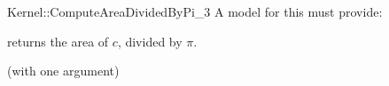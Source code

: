 \begin{ccRefFunctionObjectConcept}{Kernel::ComputeAreaDividedByPi_3}
A model for this must provide:


       {returns the area of $c$, divided by $\pi$. }

\ccRefines
{} (with one argument)

\ccSeeAlso
{}\\

\end{ccRefFunctionObjectConcept}
